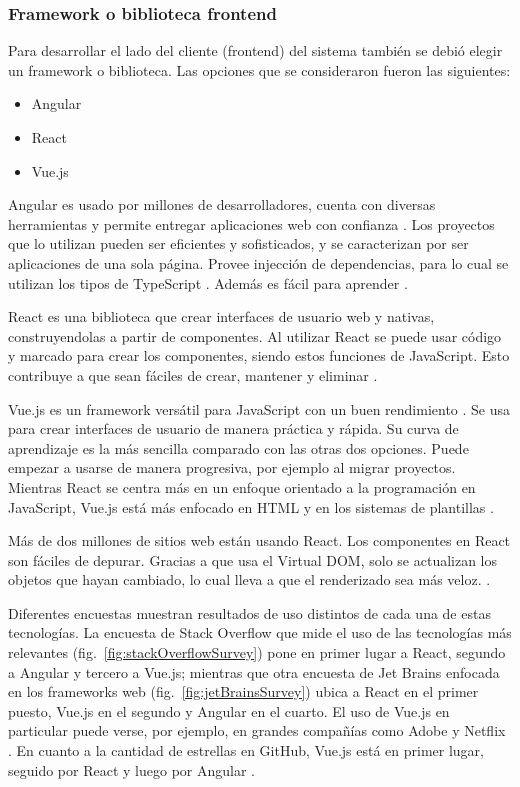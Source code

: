 \documentclass{article}
\begin{document}
\subsubsection{Framework o biblioteca frontend}
Para desarrollar el lado del cliente (frontend) del sistema también se debió elegir un framework o biblioteca. Las opciones que se consideraron fueron las siguientes:
\begin{itemize}
    \item Angular
    \item React
    \item Vue.js
\end{itemize}
 Angular es usado por millones de desarrolladores, cuenta con diversas herramientas y permite entregar aplicaciones web con confianza \parencite{angularHome}. Los proyectos que lo utilizan pueden ser eficientes y sofisticados, y se caracterizan por ser aplicaciones de una sola página. Provee injección de dependencias, para lo cual se utilizan los tipos de TypeScript \parencite{angularDocsIntroduction}. Además es fácil para aprender \parencite{w3schoolsAngular}. 

 React es una biblioteca que crear interfaces de usuario web y nativas, construyendolas a partir de componentes. Al utilizar React se puede usar código y marcado para crear los componentes, siendo estos funciones de JavaScript. Esto contribuye a que sean fáciles de crear, mantener y eliminar \parencite{reactOfficialHome}.

 Vue.js es un framework versátil para JavaScript con un buen rendimiento \parencite{vueOfficialHome}. Se usa para crear interfaces de usuario de manera práctica y rápida. Su curva de aprendizaje es la más sencilla comparado con las otras dos opciones. Puede empezar a usarse de manera progresiva, por ejemplo al migrar proyectos. Mientras React se centra más en un enfoque orientado a la programación en JavaScript, Vue.js está más enfocado en HTML y en los sistemas de plantillas \parencite{manz}.

Más de dos millones de sitios web están usando React. Los componentes en React son fáciles de depurar. Gracias a que usa el Virtual DOM, solo se actualizan los objetos que hayan cambiado, lo cual lleva a que el renderizado sea más veloz.  \parencite{galikReact}.

Diferentes encuestas muestran resultados de uso distintos de cada una de estas tecnologías. La encuesta de Stack Overflow que mide el uso de las tecnologías más relevantes (fig.~\ref{fig:stackOverflowSurvey}) pone en primer lugar a React, segundo a Angular y tercero a Vue.js; mientras que otra encuesta de Jet Brains enfocada en los frameworks web (fig.~\ref{fig:jetBrainsSurvey}) ubica a React en el primer puesto, Vue.js en el segundo y Angular en el cuarto. El uso de Vue.js en particular puede verse, por ejemplo, en grandes compañías como Adobe y Netflix \parencite{scalablepathVue}. En cuanto a la cantidad de estrellas en GitHub, Vue.js está en primer lugar, seguido por React y luego por Angular \parencite{codeinwp}.
\end{document}
